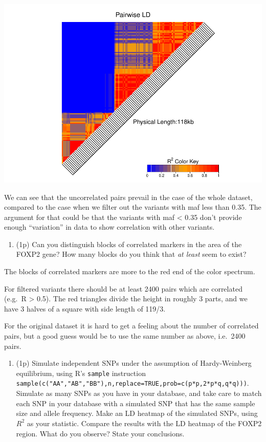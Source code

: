 \documentclass[
]{article}
\providecommand{\tightlist}{%
  \setlength{\itemsep}{0pt}\setlength{\parskip}{0pt}}
\begin{document}
\includegraphics{P032020_LD_files/figure-latex/9th-2.pdf}

We can see that the uncorrelated pairs prevail in the case of the whole
dataset, compared to the case when we filter out the variants with maf
less than 0.35. The argument for that could be that the variants with
maf \textless{} 0.35 don't provide enough ``variation'' in data to show
correlation with other variants.

\begin{enumerate}
\def\labelenumi{\arabic{enumi}.}
\setcounter{enumi}{9}
\tightlist
\item
  (1p) Can you distinguish blocks of correlated markers in the area of
  the FOXP2 gene? How many blocks do you think that \emph{at least} seem
  to exist?
\end{enumerate}

The blocks of correlated markers are more to the red end of the color
spectrum.

For filtered variants there should be at least 2400 pairs which are
correlated (e.g.~R \textgreater{} 0.5). The red triangles divide the
height in roughly 3 parts, and we have 3 halves of a square with side
length of 119/3.

For the original dataset it is hard to get a feeling about the number of
correlated pairs, but a good guess would be to use the same number as
above, i.e.~2400 pairs.

\begin{enumerate}
\def\labelenumi{\arabic{enumi}.}
\setcounter{enumi}{10}
\tightlist
\item
  (1p) Simulate independent SNPs under the assumption of Hardy-Weinberg
  equilibrium, using R's \texttt{sample} instruction
  \texttt{sample(c("AA","AB","BB"),n,replace=TRUE,prob=c(p*p,2*p*q,q*q)))}.
  Simulate as many SNPs as you have in your database, and take care to
  match each SNP in your database with a simulated SNP that has the same
  sample size and allele frequency. Make an LD heatmap of the simulated
  SNPs, using \(R^2\) as your statistic. Compare the results with the LD
  heatmap of the FOXP2 region. What do you observe? State your
  conclusions.
\end{enumerate}
\end{document}
